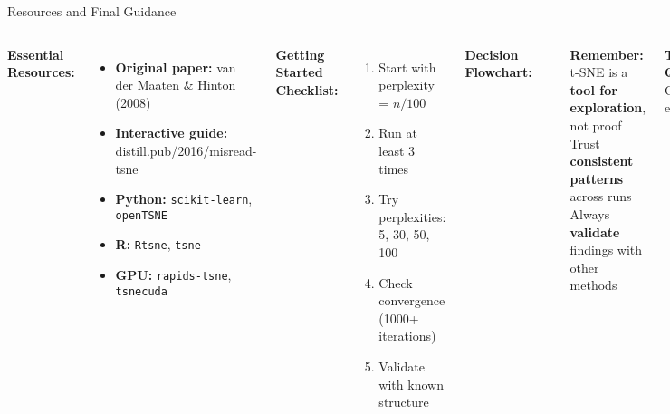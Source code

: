 \documentclass[aspectratio=169]{beamer}
\begin{document}
\begin{frame}{Resources and Final Guidance}
\begin{columns}
\textbf{Essential Resources:}
\begin{itemize}
\item \textbf{Original paper:} van der Maaten \& Hinton (2008)
\item \textbf{Interactive guide:} distill.pub/2016/misread-tsne
\item \textbf{Python:} \texttt{scikit-learn}, \texttt{openTSNE}
\item \textbf{R:} \texttt{Rtsne}, \texttt{tsne}
\item \textbf{GPU:} \texttt{rapids-tsne}, \texttt{tsnecuda}
\end{itemize}

\textbf{Getting Started Checklist:}
\begin{enumerate}
\item Start with perplexity = $n/100$
\item Run at least 3 times
\item Try perplexities: 5, 30, 50, 100
\item Check convergence (1000+ iterations)
\item Validate with known structure
\end{enumerate}

\textbf{Decision Flowchart:}
\begin{center}
\end{center}

\vspace{0.3cm}
\textbf{Remember:}\\
t-SNE is a \textbf{tool for exploration}, not proof\\
Trust \textbf{consistent patterns} across runs\\
Always \textbf{validate} findings with other methods

\vspace{0.3cm}
\begin{center}
\colorbox{blue!20}{\textbf{Thank you! Questions welcome}}\\
\small Contact: eraco@polytechnic.cat
\end{center}
\end{columns}
\end{frame}
\end{document}
